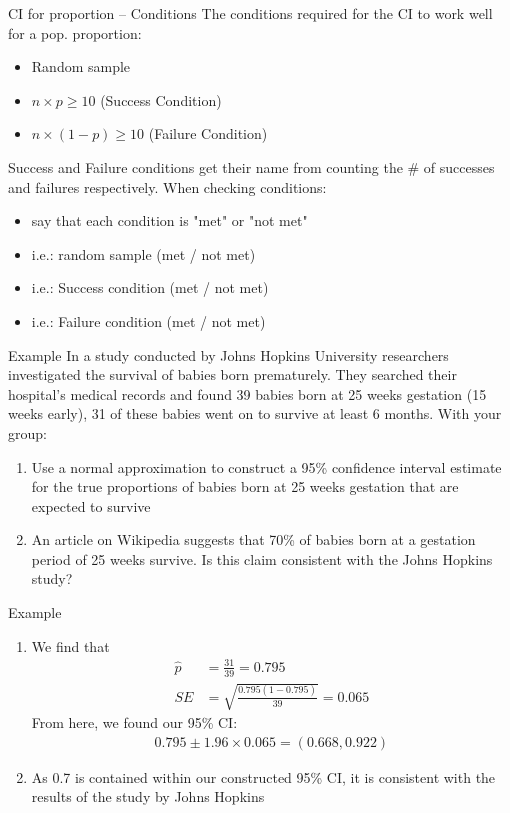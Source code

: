 \documentclass{beamer}
\begin{document}
\begin{frame}{CI for proportion -- Conditions}
The conditions required for the CI to work well for a pop. proportion:

\begin{itemize}
    \item Random sample
    \item $n \times p \geq 10$ (Success Condition)
    \item $n \times (1-p) \geq 10$ (Failure Condition)
\end{itemize} \vspace{6mm}

Success and Failure conditions get their name from counting the \# of successes and failures respectively. When checking conditions:

\begin{itemize}
    \item say that each condition is "met" or "not met"
    \item i.e.: random sample (met / not met)
    \item i.e.: Success condition (met / not met)
    \item i.e.: Failure condition (met / not met)
\end{itemize}
\end{frame}

\begin{frame}{Example}
\small
In a study conducted by Johns Hopkins University researchers
investigated the survival of babies born prematurely. They searched
their hospital’s medical records and found 39 babies born at 25
weeks gestation (15 weeks early), 31 of these babies went on to
survive at least 6 months. With your group:
\begin{enumerate}
\item Use a normal approximation to construct a 95\% confidence interval estimate for the true proportions of babies born at 25 weeks gestation that are expected to survive
\item An article on Wikipedia suggests that 70\% of babies born at a gestation period of 25 weeks survive. Is this claim consistent with the Johns Hopkins study?
\end{enumerate}
\end{frame}

\begin{frame}{Example}
\small
\begin{enumerate}
\item We find that
\begin{align*}
\hat{p} &= \frac{31}{39} = 0.795 \\
SE &= \sqrt{\frac{0.795(1-0.795)}{39}} = 0.065
\end{align*}
From here, we found our 95\% CI:
\begin{align*}
0.795 \pm 1.96 \times 0.065 = (0.668, 0.922)
\end{align*}
\item As 0.7 is contained within our constructed 95\% CI, it is consistent with the results of the study by Johns Hopkins
\end{enumerate}
\end{frame}
\end{document}
